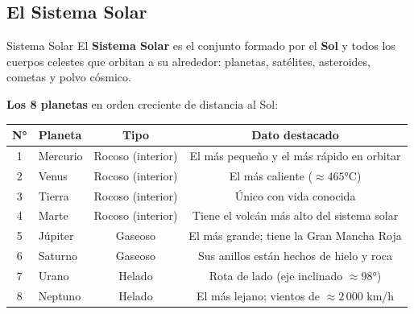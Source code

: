 \documentclass[11pt]{article}
\begin{document}
	\subsection{El Sistema Solar}
	\begin{defbox}{Sistema Solar}
		El \textbf{Sistema Solar} es el conjunto formado por el \textbf{Sol} y todos los cuerpos celestes que orbitan a su alrededor: planetas, sat\'elites, asteroides, cometas y polvo c\'osmico.
	\end{defbox}
	\textbf{Los 8 planetas} en orden creciente de distancia al Sol:
	
	\begin{center}
		\begin{tabular}{clcc}
			\toprule
			N° & Planeta & Tipo & Dato destacado \\
			\midrule
			1 & Mercurio & Rocoso (interior) & El m\'as peque\~no y el m\'as r\'apido en orbitar \\
			2 & Venus & Rocoso (interior) & El m\'as caliente ($\approx 465°$C) \\
			3 & Tierra & Rocoso (interior) & \'Unico con vida conocida \\
			4 & Marte & Rocoso (interior) & Tiene el volc\'an m\'as alto del sistema solar \\
			5 & J\'upiter & Gaseoso & El m\'as grande; tiene la Gran Mancha Roja \\
			6 & Saturno & Gaseoso & Sus anillos est\'an hechos de hielo y roca \\
			7 & Urano & Helado & Rota de lado (eje inclinado $\approx 98°$) \\
			8 & Neptuno & Helado & El m\'as lejano; vientos de $\approx 2\,000$ km/h \\
			\bottomrule
		\end{tabular}
	\end{center}
\end{document}
